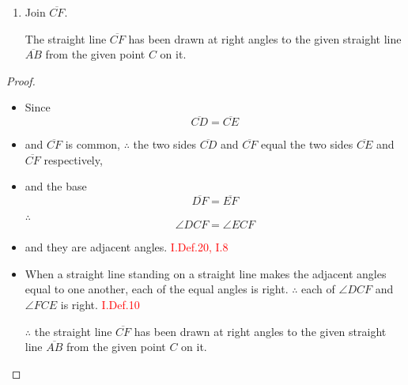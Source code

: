 \begin{enumerate}
\clearpage

\item Join $\overline{CF}$.

\begin{figure}[H]
	\caption{}
\end{figure}

\begin{lemma}
The straight line $\overline{CF}$ has been drawn at right angles to the given straight line $\overline{AB}$ from the given point $C$ on it.
\end{lemma}

\end{enumerate}

\begin{proof}

\begin{itemize}

\item[]

\item Since 
\[\overline{CD} = \overline{CE}\]

\item and $\overline{CF}$ is common, $\therefore$ the two sides $\overline{CD}$ and $\overline{CF}$ equal the two sides $\overline{CE}$ and $\overline{CF}$ respectively, 

\item and the base 
\[\overline{DF} = \overline{EF}\]

\item[$\therefore$] 
\[\angle{DCF} = \angle{ECF}\] 

\item and they are adjacent angles. \hfill\textcolor{red}{ I.Def.20, I.8}

\item When a straight line standing on a straight line makes the adjacent angles equal to one another, each of the equal angles is right. $\therefore$ each of $\angle{DCF}$ and $\angle{FCE}$ is right. \hfill\textcolor{red}{I.Def.10}

\item[$\therefore$] the straight line $\overline{CF}$ has been drawn at right angles to the given straight line $\overline{AB}$ from the given point $C$ on it.

\end{itemize}

\end{proof}

\clearpage
